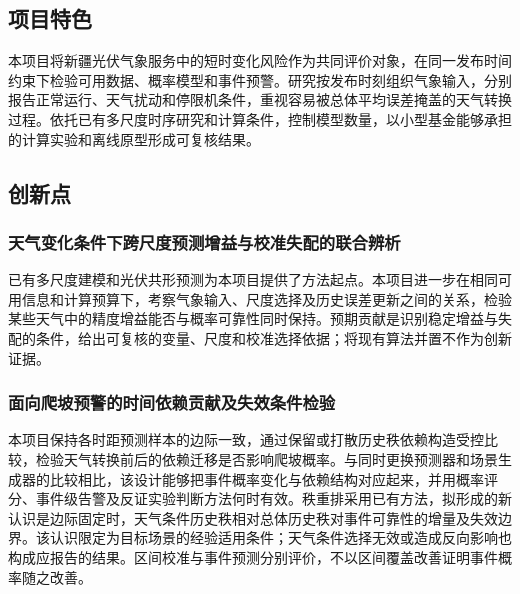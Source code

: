 \subsection{项目特色}
本项目将新疆光伏气象服务中的短时变化风险作为共同评价对象，在同一发布时间约束下检验可用数据、概率模型和事件预警。研究按发布时刻组织气象输入，分别报告正常运行、天气扰动和停限机条件，重视容易被总体平均误差掩盖的天气转换过程。依托已有多尺度时序研究和计算条件，控制模型数量，以小型基金能够承担的计算实验和离线原型形成可复核结果。

\subsection{创新点}
\subsubsection{天气变化条件下跨尺度预测增益与校准失配的联合辨析}
已有多尺度建模和光伏共形预测为本项目提供了方法起点。本项目进一步在相同可用信息和计算预算下，考察气象输入、尺度选择及历史误差更新之间的关系，检验某些天气中的精度增益能否与概率可靠性同时保持。预期贡献是识别稳定增益与失配的条件，给出可复核的变量、尺度和校准选择依据；将现有算法并置不作为创新证据。

\subsubsection{面向爬坡预警的时间依赖贡献及失效条件检验}
本项目保持各时距预测样本的边际一致，通过保留或打散历史秩依赖构造受控比较，检验天气转换前后的依赖迁移是否影响爬坡概率。与同时更换预测器和场景生成器的比较相比，该设计能够把事件概率变化与依赖结构对应起来，并用概率评分、事件级告警及反证实验判断方法何时有效。秩重排采用已有方法，拟形成的新认识是边际固定时，天气条件历史秩相对总体历史秩对事件可靠性的增量及失效边界。该认识限定为目标场景的经验适用条件；天气条件选择无效或造成反向影响也构成应报告的结果。区间校准与事件预测分别评价，不以区间覆盖改善证明事件概率随之改善。
